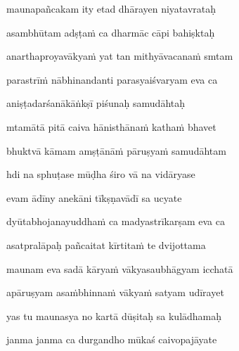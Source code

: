 maunapañcakam ity etad dhārayen niyatavrataḥ \veg\dontdisplaylinenum

asambhūtam adṣṭa\.m ca dharmāc cāpi bahiṣktaḥ\thinspace{\dandab} \dontdisplaylinenum

anarthaproyavākya\.m yat tan mithyāvacana\.m smtam \veg\dontdisplaylinenum

parastrī\.m nābhinandanti parasyaiśvaryam eva ca\thinspace{\dandab} \dontdisplaylinenum

aniṣṭadarśanākāṅkṣī piśunaḥ samudāhtaḥ \veg\dontdisplaylinenum

mtamātā pitā caiva hānisthāna\.m katha\.m bhavet\thinspace{\dandab} \dontdisplaylinenum

bhuktvā kāmam amṣṭānā\.m pāruṣya\.m samudāhtam \veg\dontdisplaylinenum

hdi na sphuṭase mūḍha śiro vā na vidāryase\thinspace{\dandab} \dontdisplaylinenum

evam ādīny anekāni tīkṣṇavādī sa ucyate \veg\dontdisplaylinenum

dyūtabhojanayuddha\.m ca madyastrīkarṣam eva ca\thinspace{\dandab} \dontdisplaylinenum

asatpralāpaḥ pañcaitat kīrtita\.m te dvijottama \veg\dontdisplaylinenum

maunam eva sadā kārya\.m vākyasaubhāgyam icchatā\thinspace{\dandab} \dontdisplaylinenum

apāruṣyam asa\.mbhinna\.m vākya\.m satyam udīrayet \veg\dontdisplaylinenum

yas tu maunasya no kartā dūṣitaḥ sa kulādhamaḥ\thinspace{\dandab} \dontdisplaylinenum

janma janma ca durgandho mūkaś caivopajāyate \veg\dontdisplaylinenum

